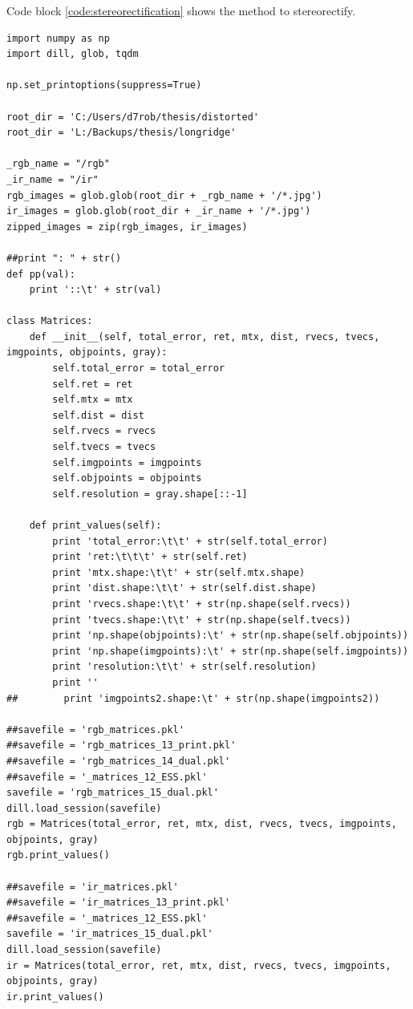 \begin{appendices}
\begin{lstlisting}
\end{lstlisting}

\newpage
Code block \ref{code:stereorectification} shows the method to stereorectify.

\begin{lstlisting}
import numpy as np
import dill, glob, tqdm

np.set_printoptions(suppress=True)

root_dir = 'C:/Users/d7rob/thesis/distorted'
root_dir = 'L:/Backups/thesis/longridge'

_rgb_name = "/rgb"
_ir_name = "/ir"
rgb_images = glob.glob(root_dir + _rgb_name + '/*.jpg')
ir_images = glob.glob(root_dir + _ir_name + '/*.jpg')
zipped_images = zip(rgb_images, ir_images)

##print ": " + str()
def pp(val):
    print '::\t' + str(val)

class Matrices:
    def __init__(self, total_error, ret, mtx, dist, rvecs, tvecs, imgpoints, objpoints, gray):
        self.total_error = total_error
        self.ret = ret
        self.mtx = mtx
        self.dist = dist
        self.rvecs = rvecs
        self.tvecs = tvecs
        self.imgpoints = imgpoints
        self.objpoints = objpoints
        self.resolution = gray.shape[::-1]

    def print_values(self):
        print 'total_error:\t\t' + str(self.total_error)
        print 'ret:\t\t\t' + str(self.ret)
        print 'mtx.shape:\t\t' + str(self.mtx.shape)
        print 'dist.shape:\t\t' + str(self.dist.shape)
        print 'rvecs.shape:\t\t' + str(np.shape(self.rvecs))
        print 'tvecs.shape:\t\t' + str(np.shape(self.tvecs))
        print 'np.shape(objpoints):\t' + str(np.shape(self.objpoints))
        print 'np.shape(imgpoints):\t' + str(np.shape(self.imgpoints))
        print 'resolution:\t\t' + str(self.resolution)
        print ''
##        print 'imgpoints2.shape:\t' + str(np.shape(imgpoints2))

##savefile = 'rgb_matrices.pkl'
##savefile = 'rgb_matrices_13_print.pkl'
##savefile = 'rgb_matrices_14_dual.pkl'
##savefile = '_matrices_12_ESS.pkl'
savefile = 'rgb_matrices_15_dual.pkl'
dill.load_session(savefile)
rgb = Matrices(total_error, ret, mtx, dist, rvecs, tvecs, imgpoints, objpoints, gray)
rgb.print_values()

##savefile = 'ir_matrices.pkl'
##savefile = 'ir_matrices_13_print.pkl'
##savefile = '_matrices_12_ESS.pkl'
savefile = 'ir_matrices_15_dual.pkl'
dill.load_session(savefile)
ir = Matrices(total_error, ret, mtx, dist, rvecs, tvecs, imgpoints, objpoints, gray)
ir.print_values()


\end{lstlisting}
\end{appendices}
